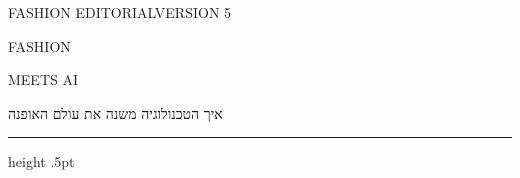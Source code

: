 \setlength{\parskip}{0pt}
\begin{english}\raggedright
{\englishfont\fontsize{9}{11}\selectfont{}FASHION EDITORIAL\hfill VERSION 5\par}
\vspace{4.5mm}
{\latindisplay\fontsize{108}{99}\selectfont{}FASHION\par}
{\latindisplay\fontsize{78}{73}\selectfont MEETS \hfill AI\par}
\end{english}
\vspace{4mm}
{\heebodisplay\fontsize{27}{32}\selectfont איך הטכנולוגיה משנה את עולם האופנה\par}
\vspace{4mm}
\vfill
{\color{Silver}\hrule height .5pt}
\vspace{2mm}
{\heebofont\fontsize{10.5}{14}\selectfont\CoverAuthors\par}
\setlength{\parskip}{7pt}

